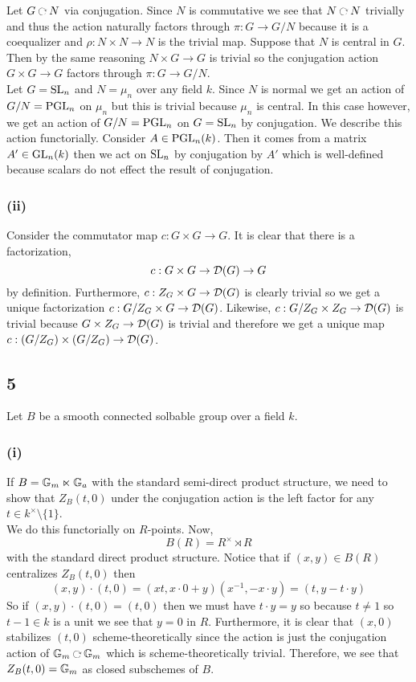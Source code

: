 \documentclass[12pt]{article}
\begin{document}
Let $G \acts N$ via conjugation. Since $N$ is commutative we see that $N \acts N$ trivially and thus the action naturally factors through $\pi : G \to G/N$ because it is a coequalizer and $\rho : N \times N \to N$ is the trivial map. Suppose that $N$ is central in $G$. Then by the same reasoning $N \times G \to G$ is trivial so the conjugation action $G \times G \to G$ factors through $\pi : G \to G/N$.
\bigskip\\
Let $G  = \mathrm{SL}_n$ and $N = \mu_n$ over any field $k$. Since $N$ is normal we get an action of $G/N = \mathrm{PGL}_n$ on $\mu_n$ but this is trivial because $\mu_n$ is central. In this case however, we get an action of $G / N = \mathrm{PGL}_n$ on $G = \mathrm{SL}_n$ by conjugation. We describe this action functorially. Consider $A \in \mathrm{PGL}_n(k)$. Then it comes from a matrix $A' \in \mathrm{GL}_n(k)$ then we act on $\mathrm{SL}_n$ by conjugation by $A'$ which is well-defined because scalars do not effect the result of conjugation.

\subsubsection{(ii)}

Consider the commutator map $c : G \times G \to G$. It is clear that there is a factorization,
\[ c : G \times G \to \mathcal{D}(G) \to G \]
by definition. Furthermore, $c : Z_G \times G \to \mathcal{D}(G)$ is clearly trivial so we get a unique factorization $c : G / Z_G \times G \to \mathcal{D}(G)$. Likewise, $c : G/Z_G \times Z_G \to \mathcal{D}(G)$ is trivial because $G \times Z_G \to \mathcal{D}(G)$ is trivial and therefore we get a unique map $c : (G / Z_G) \times (G / Z_G) \to \mathcal{D}(G)$.

\subsection{5}

Let $B$ be a smooth connected solbable group over a field $k$.

\subsubsection{(i)}

If $B = \mathbb{G}_m \ltimes \mathbb{G}_a$ with the standard semi-direct product structure, we need to show that $Z_B(t,0)$ under the conjugation action is the left factor for any $t \in k^\times \setminus \{ 1 \}$. 
\bigskip\\
We do this functorially on $R$-points. Now,
\[ B(R) = R^\times \rtimes R \]
with the standard direct product structure. Notice that if $(x,y) \in B(R)$ centralizes $Z_B(t,0)$ then  \[ (x,y) \cdot (t,0) = (xt, x \cdot 0 + y) (x^{-1}, - x \cdot y) = (t, y - t \cdot y) \]
So if $(x,y) \cdot (t,0) = (t,0)$ then we must have $t \cdot y = y$ so because $t \neq 1$ so $t - 1 \in k$ is a unit we see that $y = 0$ in $R$. Furthermore, it is clear that $(x, 0)$ stabilizes $(t,0)$ scheme-theoretically since the action is just the conjugation action of $\Gm \acts \Gm$ which is scheme-theoretically trivial. Therefore, we see that $Z_B(t,0) = \mathbb{G}_m$ as closed subschemes of $B$. 
\end{document}
